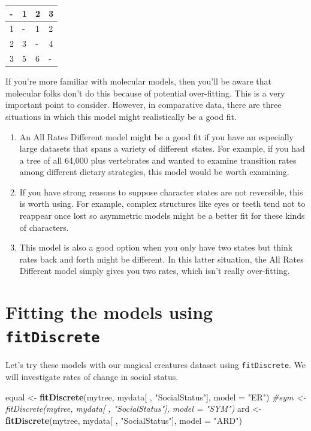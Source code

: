 \documentclass[]{book}
\newenvironment{Shaded}{\begin{snugshade}}{\end{snugshade}}
\newcommand{\KeywordTok}[1]{\textcolor[rgb]{0.13,0.29,0.53}{\textbf{{#1}}}}
\newcommand{\DataTypeTok}[1]{\textcolor[rgb]{0.13,0.29,0.53}{{#1}}}
\newcommand{\StringTok}[1]{\textcolor[rgb]{0.31,0.60,0.02}{{#1}}}
\newcommand{\CommentTok}[1]{\textcolor[rgb]{0.56,0.35,0.01}{\textit{{#1}}}}
\newcommand{\NormalTok}[1]{{#1}}
\providecommand{\tightlist}{%
  \setlength{\itemsep}{0pt}\setlength{\parskip}{0pt}}
\theoremstyle{definition}
\theoremstyle{definition}
\theoremstyle{definition}
\theoremstyle{remark}
\begin{document}
\begin{longtable}[]{@{}llll@{}}
\toprule
- & 1 & 2 & 3\tabularnewline
\midrule
\endhead
1 & - & 1 & 2\tabularnewline
2 & 3 & - & 4\tabularnewline
3 & 5 & 6 & -\tabularnewline
\bottomrule
\end{longtable}

If you're more familiar with molecular models, then you'll be aware that
molecular folks don't do this because of potential over-fitting. This is
a very important point to consider. However, in comparative data, there
are three situations in which this model might realistically be a good
fit.

\begin{enumerate}
\def\labelenumi{\arabic{enumi}.}
\tightlist
\item
  An All Rates Different model might be a good fit if you have an
  especially large datasets that spans a variety of different states.
  For example, if you had a tree of all 64,000 plus vertebrates and
  wanted to examine transition rates among different dietary strategies,
  this model would be worth examining.
\item
  If you have strong reasons to suppose character states are not
  reversible, this is worth using. For example, complex structures like
  eyes or teeth tend not to reappear once lost so asymmetric models
  might be a better fit for these kinds of characters.
\item
  This model is also a good option when you only have two states but
  think rates back and forth might be different. In this latter
  situation, the All Rates Different model simply gives you two rates,
  which isn't really over-fitting.
\end{enumerate}

\section{\texorpdfstring{Fitting the models using
\texttt{fitDiscrete}}{Fitting the models using fitDiscrete}}\label{fitting-the-models-using-fitdiscrete}

Let's try these models with our magical creatures dataset using
\texttt{fitDiscrete}. We will investigate rates of change in social
status.

\begin{Shaded}
\begin{Highlighting}[]
\NormalTok{equal <-}\StringTok{ }\KeywordTok{fitDiscrete}\NormalTok{(mytree, mydata[ , }\StringTok{"SocialStatus"}\NormalTok{], }\DataTypeTok{model =} \StringTok{"ER"}\NormalTok{)}
\CommentTok{#sym <- fitDiscrete(mytree, mydata[ , "SocialStatus"], model = "SYM")}
\NormalTok{ard <-}\StringTok{ }\KeywordTok{fitDiscrete}\NormalTok{(mytree, mydata[ , }\StringTok{"SocialStatus"}\NormalTok{], }\DataTypeTok{model =} \StringTok{"ARD"}\NormalTok{)}
\end{Highlighting}
\end{Shaded}
\end{document}
